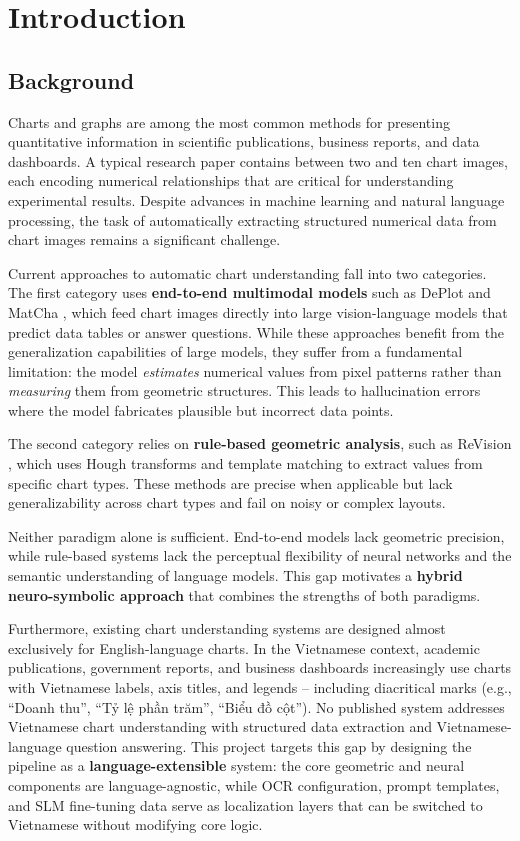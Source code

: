 \section{Introduction}

\subsection{Background}

Charts and graphs are among the most common methods for presenting quantitative information
in scientific publications, business reports, and data dashboards. A typical research paper
contains between two and ten chart images, each encoding numerical relationships that are
critical for understanding experimental results. Despite advances in machine learning and
natural language processing, the task of automatically extracting structured numerical data
from chart images remains a significant challenge.

Current approaches to automatic chart understanding fall into two categories. The first
category uses \textbf{end-to-end multimodal models} such as DePlot \cite{liu2023deplot} and
MatCha \cite{lee2023matcha}, which feed chart images directly into large vision-language
models that predict data tables or answer questions. While these approaches benefit from the
generalization capabilities of large models, they suffer from a fundamental limitation:
the model \emph{estimates} numerical values from pixel patterns rather than \emph{measuring}
them from geometric structures. This leads to hallucination errors where the model fabricates
plausible but incorrect data points.

The second category relies on \textbf{rule-based geometric analysis}, such as ReVision
\cite{savva2011revision}, which uses Hough transforms and template matching to extract
values from specific chart types. These methods are precise when applicable but lack
generalizability across chart types and fail on noisy or complex layouts.

Neither paradigm alone is sufficient. End-to-end models lack geometric precision, while
rule-based systems lack the perceptual flexibility of neural networks and the semantic
understanding of language models. This gap motivates a \textbf{hybrid neuro-symbolic
approach} that combines the strengths of both paradigms.

Furthermore, existing chart understanding systems are designed almost exclusively for
English-language charts. In the Vietnamese context, academic publications, government
reports, and business dashboards increasingly use charts with Vietnamese labels, axis
titles, and legends -- including diacritical marks (e.g., ``Doanh thu'',
``Tỷ lệ phần trăm'',
``Biểu đồ cột''). No published
system addresses Vietnamese chart understanding with structured data extraction and
Vietnamese-language question answering. This project targets this gap by designing the
pipeline as a \textbf{language-extensible} system: the core geometric and neural
components are language-agnostic, while OCR configuration, prompt templates, and SLM
fine-tuning data serve as localization layers that can be switched to Vietnamese without
modifying core logic.


